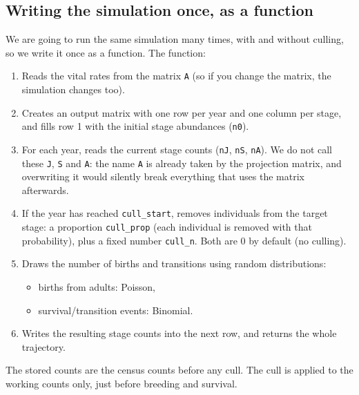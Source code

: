 \documentclass[
  a4paper]{book}
\providecommand{\tightlist}{%
  \setlength{\itemsep}{0pt}\setlength{\parskip}{0pt}}
\begin{document}
\subsection{Writing the simulation once, as a function}\label{writing-the-simulation-once-as-a-function}

We are going to run the same simulation many times, with and without culling, so we write it once as a function. The function:

\begin{enumerate}
\def\labelenumi{\arabic{enumi}.}
\tightlist
\item
  Reads the vital rates from the matrix \texttt{A} (so if you change the matrix, the simulation changes too).
\item
  Creates an output matrix with one row per year and one column per stage, and fills row 1 with the initial stage abundances (\texttt{n0}).
\item
  For each year, reads the current stage counts (\texttt{nJ}, \texttt{nS}, \texttt{nA}). We do not call these \texttt{J}, \texttt{S} and \texttt{A}: the name \texttt{A} is already taken by the projection matrix, and overwriting it would silently break everything that uses the matrix afterwards.
\item
  If the year has reached \texttt{cull\_start}, removes individuals from the target stage: a proportion \texttt{cull\_prop} (each individual is removed with that probability), plus a fixed number \texttt{cull\_n}. Both are 0 by default (no culling).
\item
  Draws the number of births and transitions using random distributions:

  \begin{itemize}
  \tightlist
  \item
    births from adults: Poisson,
  \item
    survival/transition events: Binomial.
  \end{itemize}
\item
  Writes the resulting stage counts into the next row, and returns the whole trajectory.
\end{enumerate}

The stored counts are the census counts before any cull. The cull is applied to the working counts only, just before breeding and survival.
\end{document}

